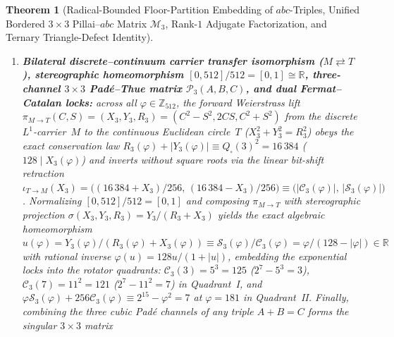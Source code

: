 \documentclass[11pt,a4paper]{article}
\theoremstyle{plain}
\newtheorem{theorem}{Theorem}[section]
\theoremstyle{definition}
\begin{document}
\begin{theorem}[Radical-Bounded Floor-Partition Embedding of $abc$-Triples, Unified Bordered $3\times 3$ Pillai--$abc$ Matrix $\mathcal{M}_3$, Rank-$1$ Adjugate Factorization, and Ternary Triangle-Defect Identity]
\begin{enumerate}[label=\textbf{(\roman*)},leftmargin=*]
  \[
    u_a(u_b - u_c)(u_b u_c - 1) \;+\; u_b(u_c - u_a)(u_a u_c - 1) \;\equiv\; u_c(u_b - u_a)(u_a u_b - 1),
  \]
  where $\gcd(u_i u_j - 1,\,u_i u_j) = 1$ forces new prime factors coprime to $u_a u_b u_c$ into $\operatorname{rad}(A B C)$ (generating $3^3 + 5 = 2^5$ at $(1,2,5)$ and $41 + 175 = 6^3$, i.e., $6^3 - 7\cdot 5^2 = 6\cdot 7 - 1 = 41$, at $(1,6,7)$). Finally, under shaft involution $(c_1\leftrightarrow c_2, a_1\leftrightarrow a_2)$, the horizontal $3\times 3$ trace invariant $\mathcal{I}_{\mathrm{horiz}} = (x^{a'}-x^a)^2 - (y^{b'}-y^b)^2$ combines with the vertical $2\times 2$ cone invariant $\mathcal{I}_{\mathrm{vert}} = (x^a-y^b)^2 - (x^{a'}-y^{b'})^2$ via $(\mathcal{I}_{\mathrm{vert}} - \mathcal{I}_{\mathrm{horiz}})/(\mathcal{I}_{\mathrm{vert}} + \mathcal{I}_{\mathrm{horiz}}) = (x^{a'}-y^b)/(x^a-y^{b'})$ and yields on Lock~III ($5^3 - 3^4 = 44 = 4\times 11$) the double Pythagorean identity $(3^3-3^1)^2 + (11-4)^2 = 24^2 + 7^2 = 15^2 + 20^2 = k_{\mathrm{III}}^2 + (5^2-5^1)^2 = 25^2 = 625$.
\item \textbf{Bilateral discrete--continuum carrier transfer isomorphism ($M \rightleftarrows T$), stereographic homeomorphism $[0,512]/512 = [0,1] \cong \mathbb{R}$, three-channel $3\times 3$ Pad\'e--Thue matrix $\mathcal{P}_3(A,B,C)$, and dual Fermat--Catalan locks:}
  across all $\varphi\in\mathbb{Z}_{512}$, the forward Weierstrass lift $\pi_{M\to T}(C,S) = (X_3,Y_3,R_3) = (C^2-S^2,2CS,C^2+S^2)$ from the discrete $L^1$-carrier~$M$ to the continuous Euclidean circle~$T$ ($X_3^2+Y_3^2=R_3^2$) obeys the exact conservation law $R_3(\varphi) + |Y_3(\varphi)| \equiv Q_\square(3)^2 = 16\,384$ ($128 \mid X_3(\varphi)$) and inverts without square roots via the linear bit-shift retraction $\iota_{T\to M}(X_3) = \bigl((16\,384 + X_3)/256,\,(16\,384 - X_3)/256\bigr) \equiv \bigl(|\mathcal{C}_3(\varphi)|,\,|\mathcal{S}_3(\varphi)|\bigr)$. Normalizing $[0,512]/512 = [0,1]$ and composing $\pi_{M\to T}$ with stereographic projection $\sigma(X_3,Y_3,R_3) = Y_3/(R_3+X_3)$ yields the exact algebraic homeomorphism $u(\varphi) = Y_3(\varphi)/(R_3(\varphi)+X_3(\varphi)) \equiv \mathcal{S}_3(\varphi)/\mathcal{C}_3(\varphi) = \varphi/(128-|\varphi|)\in\mathbb{R}$ with rational inverse $\varphi(u) = 128 u/(1+|u|)$, embedding the exponential locks into the rotator quadrants: $\mathcal{C}_3(3) = 5^3 = 125$ ($2^7-5^3=3$), $\mathcal{C}_3(7) = 11^2 = 121$ ($2^7-11^2=7$) in Quadrant~I, and $\varphi\mathcal{S}_3(\varphi) + 256\mathcal{C}_3(\varphi) \equiv 2^{15}-\varphi^2 = 7$ at $\varphi = 181$ in Quadrant~II. Finally, combining the three cubic Pad\'e channels of any triple $A + B = C$ forms the singular $3\times 3$ matrix

\end{enumerate}
\end{theorem}
\end{document}
